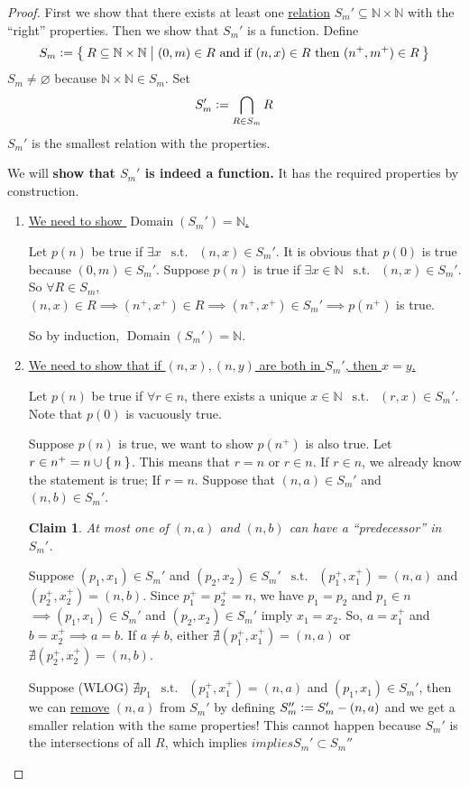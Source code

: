 \documentclass[12pt]{amsart}
\newcommand{\bbN}{\mathbb{N}}
\newcommand{\suchthat}{\operatorname{\enspace s.t. \enspace}}
\theoremstyle{plain}
\newtheorem*{claim}{Claim}
\theoremstyle{remark}
\theoremstyle{definition}
\begin{document}
\begin{proof}
	First we show that there exists at least one \ul{relation} $S_m' \subseteq \bbN \times \bbN$ with the ``right'' properties. Then we show that $S_m'$ is a function.
	Define 
	\begin{equation*}
		S_m \vcentcolon = \Set{R \subseteq \bbN \times \bbN | (0, m) \in R \text{ and if } (n,x) \in R \text{ then } (n^+, m^+)\in R}
	\end{equation*}
	$S_m \neq \varnothing$ because $\bbN \times \bbN \in S_m$. Set
	\begin{equation*}
		S_m' \vcentcolon = \bigcap\limits_{R\in S_m}R
	\end{equation*}
	$S_m'$ is the smallest relation with the properties. 
	\newline
	\par
	We will {\bf show that $S_m'$ is indeed a function.} It has the required properties by construction.
	\begin{enumerate}[(1)]
	\item \ul{We need to show  $\operatorname{Domain}(S_m') = \bbN$.}
	\par
	Let $p(n)$ be true if $\exists x \suchthat (n, x)\in S_m'$. It is obvious that $p(0)$ is true because $(0, m) \in S_m'$. 
	Suppose $p(n)$ is true if $\exists x \in \bbN \suchthat (n, x) \in S_m'$. So $\forall R \in S_m$, $(n, x) \in R \implies (n^+, x^+) \in R \implies (n^+, x^+) \in S_m' \implies p(n^+)$ is true. 
	\par
	So by induction, $\operatorname{Domain}(S_m') = \bbN$.

	\item \ul{We need to show that if $(n, x), (n, y)$ are both in $S_m'$, then $x = y$.}
	\par
	Let $p(n)$ be true if $\forall r \in n$, there exists a unique  $x \in \bbN \suchthat (r, x) \in S_m'$. Note that $p(0)$ is vacuously true.
	\par
	Suppose $p(n)$ is true, we want to show $p(n^+)$ is also true. Let $r \in n^+ = n \cup \Set{n}$. This means that $r = n $ or $ r \in n$.
	If $r \in n$, we already know the statement is true; If $r = n$. Suppose that $(n, a) \in S_m'$ and $(n, b) \in S_m'$.
	\begin{claim}
		At most one of $(n,a)$ and $(n,b)$ can have a ``predecessor'' in $S_m'$. 
	\end{claim}
	Suppose $(p_1, x_1) \in S_m'$ and $(p_2, x_2) \in S_m' \suchthat (p_1^+, x_1^+) = (n, a)$ and $(p_2^+, x_2^+) = (n, b)$. Since $p_1^+ = p_2^+ = n$, we have $p_1 = p_2$ and $p_1 \in n$ 
	$\implies (p_1,x_1) \in S_m'$ and $(p_2, x_2) \in S_m'$ imply $x_1 = x_2$.
	So, $a = x_1^+$ and $b = x_2^+ \implies a = b$. If $a \neq b$, either $\nexists (p_1^+, x_1^+) = (n, a)$ or $\nexists (p_2^+, x_2^+) = (n, b)$.
	\par
	Suppose (WLOG) $\nexists p_1 \suchthat (p_1^+, x_1^+) = (n, a)$ and $(p_1, x_1) \in S_m'$, then we can \ul{remove} $(n, a)$ from $S_m'$ by defining $S_m'' \vcentcolon = S_m' - (n,a)$ and we get a smaller relation with the same properties! This cannot happen because $S_m'$ is the intersections of all $R$, which implies $implies S_m' \subset S_m''$ 
	

\end{enumerate}
\end{proof}
\end{document}
